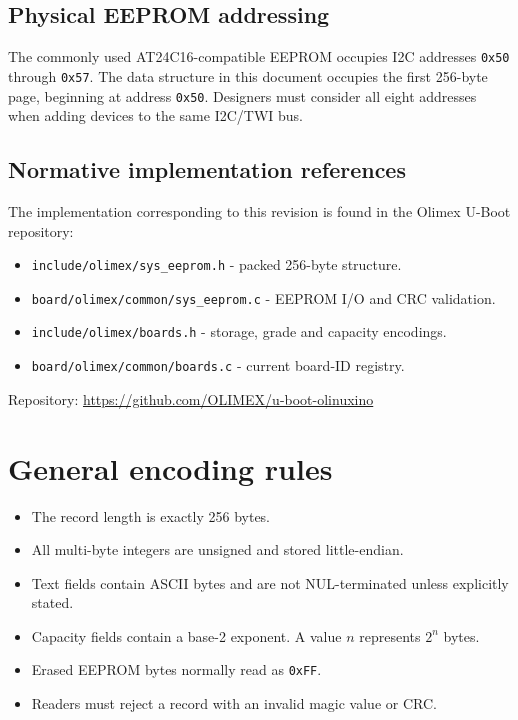 \documentclass[11pt,letterpaper]{article}
\newcommand{\hexbyte}[1]{\texttt{0x#1}}
\newcommand{\field}[1]{\texttt{#1}}
\begin{document}
\subsection{Physical EEPROM addressing}

The commonly used AT24C16-compatible EEPROM occupies I2C addresses
\hexbyte{50} through \hexbyte{57}. The data structure in this document occupies
the first 256-byte page, beginning at address \hexbyte{50}. Designers must
consider all eight addresses when adding devices to the same I2C/TWI bus.

\subsection{Normative implementation references}

The implementation corresponding to this revision is found in the Olimex
U-Boot repository:

\begin{itemize}
  \item \field{include/olimex/sys\_eeprom.h} - packed 256-byte structure.
  \item \field{board/olimex/common/sys\_eeprom.c} - EEPROM I/O and CRC validation.
  \item \field{include/olimex/boards.h} - storage, grade and capacity encodings.
  \item \field{board/olimex/common/boards.c} - current board-ID registry.
\end{itemize}

Repository: \url{https://github.com/OLIMEX/u-boot-olinuxino}

\section{General encoding rules}

\begin{itemize}
  \item The record length is exactly 256 bytes.
  \item All multi-byte integers are unsigned and stored little-endian.
  \item Text fields contain ASCII bytes and are not NUL-terminated unless
        explicitly stated.
  \item Capacity fields contain a base-2 exponent. A value $n$ represents
        $2^n$ bytes.
  \item Erased EEPROM bytes normally read as \hexbyte{FF}.
  \item Readers must reject a record with an invalid magic value or CRC.
\end{itemize}
\end{document}

